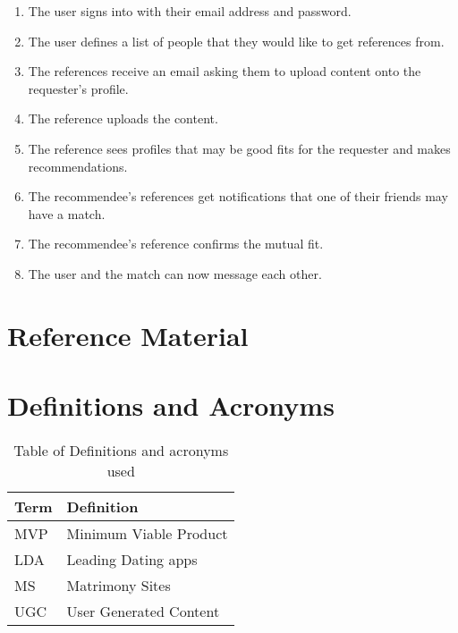\begin{enumerate}
    \item The user signs into \serviceName with their email address and password.
    \item The user defines a list of people that they would like to get references from. 
    \item The references receive an email asking them to upload content onto the requester's profile.
    \item The reference uploads the content.
    \item The reference sees profiles that may be good fits for the requester and makes recommendations.
    \item The recommendee's references get notifications that one of their friends may have a match.
    \item The recommendee's reference confirms the mutual fit.
    \item The user and the match can now message each other.
\end{enumerate}


\section{Reference Material}
\section{Definitions and Acronyms}
\begin{table}[ht]
    \centering
    \begin{tabular}{l | l}
        Term & Definition \\
        \hline
        MVP & Minimum Viable Product \\
        LDA & Leading Dating apps \\
        MS & Matrimony Sites \\
        UGC & User Generated Content \\
    \end{tabular}
    \caption{Table of Definitions and acronyms used}
    \label{tab: def_ac}
\end{table}
